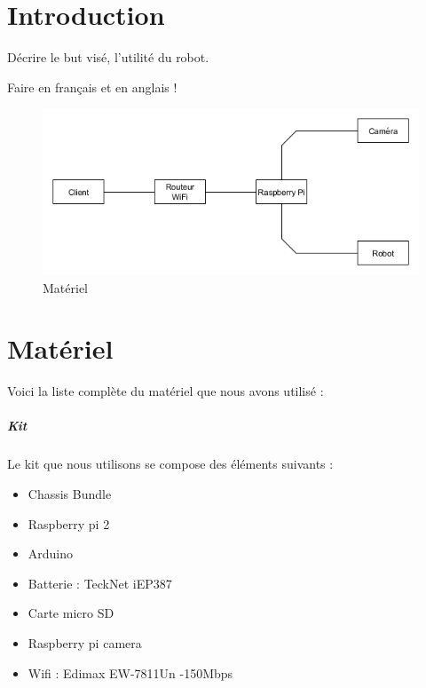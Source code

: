 \documentclass[12pt,a4paper]{report}
\begin{document}
\umonsCoverPage

\tableofcontents

\chapter{Introduction}

Décrire le but visé, l'utilité du robot.

Faire en français et en anglais !

\begin{figure}[hf!]
\center
\includegraphics[scale=0.6]{images/GraphMateriel.png}
\caption{Matériel}
\end{figure}

\chapter{Matériel} \label{Matériel}

%

Voici la liste complète du matériel que nous avons utilisé :

\paragraph{Kit} Le kit que nous utilisons se compose des éléments suivants :

\begin{itemize}
\item Chassis Bundle
\item Raspberry pi 2
\item Arduino
\item Batterie : TeckNet iEP387
\item Carte micro SD
\item Raspberry pi camera
\item Wifi : Edimax EW-7811Un -150Mbps
\end{itemize}
\end{document}
